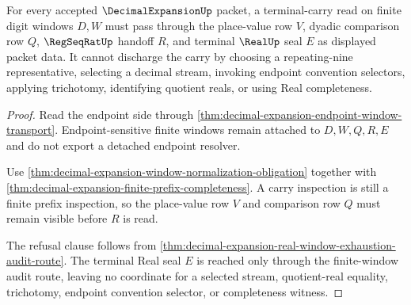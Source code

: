 \begin{theorem}
\label{thm:decimal-expansion-terminal-carry-refusal}
For every accepted $\DecimalExpansionUp$ packet, a terminal-carry read on finite digit windows $D,W$ must pass through the place-value row $V$, dyadic comparison row $Q$, $\RegSeqRatUp$ handoff $R$, and terminal $\RealUp$ seal $E$ as displayed packet data. It cannot discharge the carry by choosing a repeating-nine representative, selecting a decimal stream, invoking endpoint convention selectors, applying trichotomy, identifying quotient reals, or using Real completeness.
\end{theorem}
\begin{proof}
Read the endpoint side through \autoref{thm:decimal-expansion-endpoint-window-transport}. Endpoint-sensitive finite windows remain attached to $D,W,Q,R,E$ and do not export a detached endpoint resolver.

Use \autoref{thm:decimal-expansion-window-normalization-obligation} together with \autoref{thm:decimal-expansion-finite-prefix-completeness}. A carry inspection is still a finite prefix inspection, so the place-value row $V$ and comparison row $Q$ must remain visible before $R$ is read.

The refusal clause follows from \autoref{thm:decimal-expansion-real-window-exhaustion-audit-route}. The terminal Real seal $E$ is reached only through the finite-window audit route, leaving no coordinate for a selected stream, quotient-real equality, trichotomy, endpoint convention selector, or completeness witness.
\end{proof}

